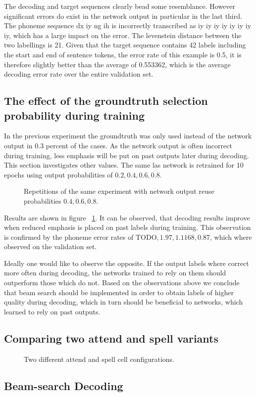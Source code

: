 The decoding and target sequences clearly bead some resemblance. However significant errors do exist in the network output in particular in the last third. The phoneme sequence dx  iy  ng  ih is incorrectly transcribed as iy  iy  iy  iy  iy  iy  iy iy,
which has a large impact on the error. The levenstein distance between the two labellings is 21. Given that the target sequence contains 42 labels including the start and end of sentence tokens, the error rate of this example is 0.5, it is therefore slightly better than the average of 0.553362, which is the average decoding error rate over the entire validation set.


\subsection{The effect of the groundtruth selection probability during training}
In the previous experiment the groundtruth was only used instead of the network output in 0.3 percent of the cases. As the network output is often incorrect during training, less emphasis will be put on past outputs later during decoding. This section investigates
other values. The same las network is retrained for 10 epochs using output probabilities of $0.2,0.4,0.6,0.8$.
\begin{figure}



\caption{Repetitions of the same experiment with network output reuse probabilities $0.4,0.6,0.8$. }
\label{fig:lasGreedy}
\end{figure}
Results are shown in figure ~\ref{fig:lasGreedy}. It can be observed, that decoding results improve when reduced emphasis is placed on past labels during training. This observation is confirmed by the phoneme error rates of $\text{TODO}, 1.97, 1.1168, 0.87$, which where observed on the validation set.

Ideally one would like to observe the opposite. If the output labels where correct more often during decoding, the networks trained to rely on them should outperform those which do not. Based on the observations above we conclude that beam search should be implemented in order to obtain labels of higher quality during decoding, which in turn should be beneficial to networks, which learned to rely on past outputs.

\subsection{Comparing two attend and spell variants}
\begin{figure}
\centering


\caption{Two different attend and spell cell configurations.}
\label{fig:lasVariants}
\end{figure}



\subsection{Beam-search Decoding}




